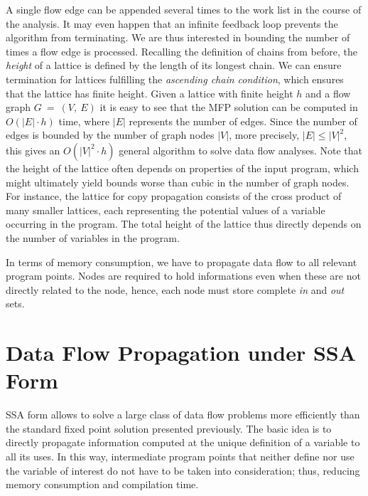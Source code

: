A single flow edge can be appended several times to the
work list in the course of the analysis. It may even happen that an infinite
feedback loop prevents the algorithm from terminating. We are thus interested in
bounding the number of times a flow edge is processed. Recalling the definition
of chains from before, %
 the \emph{height} of a
lattice is defined by the length of its longest chain. We can ensure termination
for lattices fulfilling the \emph{ascending chain condition}, which ensures that
the lattice has finite height. Given a lattice with finite height $h$ and a flow
graph $G~=~(V,~E)$ it is easy to see that the MFP solution can be computed in
$O(|E| \cdot h)$ time, where $|E|$ represents the number of edges. Since the
number of edges is bounded by the number of graph nodes $|V|$, more precisely,
$|E| \leq |V|^2$, this gives an $O(|V|^2 \cdot h)$ general algorithm to
solve data flow analyses. Note that the height of
the lattice often depends on properties of the input program, which might
ultimately yield bounds worse than cubic in the number of graph nodes. For
instance, the lattice for copy propagation consists of the cross product of many
smaller lattices, each representing the potential values of a variable occurring
in the program. The total height of the lattice thus directly depends on the
number of variables in the program.

In terms of memory consumption, we have to propagate data flow to all relevant
program points. Nodes are required to hold informations even when these
are not directly related to the node, hence, each node must store 
complete \emph{in} and \emph{out} sets.


\section{Data Flow Propagation under SSA Form}
\label{chapter:constant_propagation_is_easier:sec:prop-engine}
\label{sec:prop-engine}

SSA form allows to solve a large class of data flow problems more efficiently
than the standard fixed point solution presented previously.
The basic idea is to directly propagate information computed at the unique
definition of a variable to all its uses. In this way, intermediate program
points that neither define nor use the variable of interest do not have to
be taken into consideration; thus, reducing memory consumption
and compilation time.

